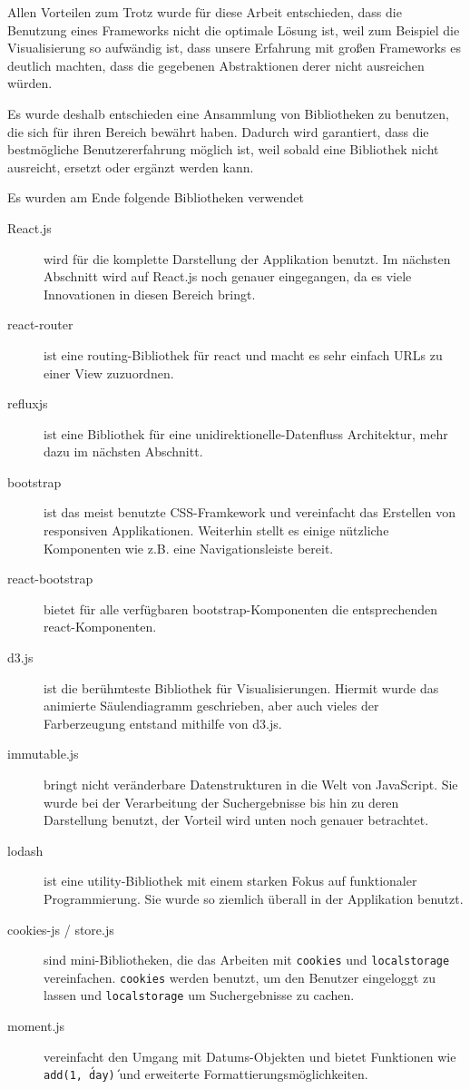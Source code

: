 \documentclass[12pt,twoside]{book}
\begin{document}
Allen Vorteilen zum Trotz wurde für diese Arbeit entschieden, dass die Benutzung eines Frameworks nicht die optimale Lösung ist, weil zum Beispiel die Visualisierung so aufwändig ist, dass unsere Erfahrung mit großen Frameworks es deutlich machten, dass die gegebenen Abstraktionen derer nicht ausreichen würden.

Es wurde deshalb entschieden eine Ansammlung von Bibliotheken zu benutzen, die sich für ihren Bereich bewährt haben. Dadurch wird garantiert, dass die bestmögliche Benutzererfahrung möglich ist, weil sobald eine Bibliothek nicht ausreicht, ersetzt oder ergänzt werden kann.

Es wurden am Ende folgende Bibliotheken verwendet

\begin{description}
	\item[React.js \cite{react}] wird für die komplette Darstellung der Applikation benutzt. Im nächsten Abschnitt wird auf React.js noch genauer eingegangen, da es viele Innovationen in diesen Bereich bringt.
	\item[react-router \cite{reactrouter}] ist eine routing-Bibliothek für react und macht es sehr einfach URLs zu einer View zuzuordnen.
	\item[refluxjs \cite{reflux}] ist eine Bibliothek für eine unidirektionelle-Datenfluss Architektur, mehr dazu im nächsten Abschnitt.
	\item[bootstrap \cite{bootstrap}] ist das meist benutzte CSS-Framkework und vereinfacht das Erstellen von responsiven Applikationen. Weiterhin stellt es einige nützliche Komponenten wie z.B. eine Navigationsleiste bereit.
	\item[react-bootstrap \cite{reactrouter}] bietet für alle verfügbaren bootstrap-Komponenten die entsprechenden react-Komponenten.
	\item[d3.js \cite{bostock2011d3}] ist die berühmteste Bibliothek für Visualisierungen. Hiermit wurde das animierte Säulendiagramm geschrieben, aber auch vieles der Farberzeugung entstand mithilfe von d3.js.
	\item[immutable.js \cite{Immutable}] bringt nicht veränderbare Datenstrukturen in die Welt von JavaScript. Sie wurde bei der Verarbeitung der Suchergebnisse bis hin zu deren Darstellung benutzt, der Vorteil wird unten noch genauer betrachtet.
	\item[lodash \cite{underscore}] ist eine utility-Bibliothek mit einem starken Fokus auf funktionaler Programmierung. Sie wurde so ziemlich überall in der Applikation benutzt.
	\item[cookies-js \cite{cookiesjs} / store.js \cite{storejs}]sind mini-Bibliotheken, die das Arbeiten mit \texttt{cookies} und \texttt{localstorage} vereinfachen. \texttt{cookies} werden benutzt, um den Benutzer eingeloggt zu lassen und \texttt{localstorage} um Suchergebnisse zu cachen.
	\item[moment.js \cite{momentjs}] vereinfacht den Umgang mit Datums-Objekten und bietet Funktionen wie \texttt{add(1, \'day\')} und erweiterte Formattierungsmöglichkeiten.
\end{description}
\end{document}
